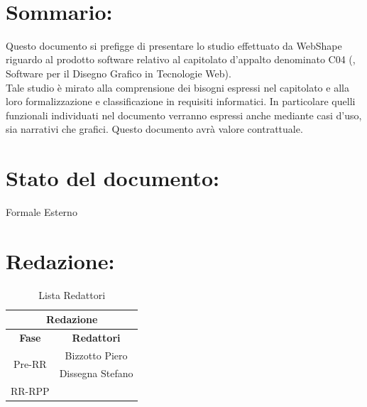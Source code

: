 \newpage


\begin{center} %
	\begin{Huge}	
				\textbf{\TITOLODOC}
			\\
	\end{Huge}
\end{center}
\parindent=18pt %
\section*{\LARGE Sommario:} %
Questo documento si prefigge di presentare lo studio effettuato da WebShape riguardo al prodotto software relativo al capitolato d'appalto denominato C04 (\blue{\ajax}, Software per il Disegno Grafico in Tecnologie Web).\\
Tale studio \`e mirato alla comprensione dei bisogni espressi nel capitolato e alla loro formalizzazione e classificazione in requisiti informatici. In particolare quelli funzionali individuati nel documento verranno espressi anche mediante casi d'uso, sia narrativi che grafici. Questo documento avr\`a valore contrattuale.

\section*{\LARGE Stato del documento:}
	Formale Esterno
\hangindent=0pt

\section*{\LARGE Redazione:}
	\begin{table}[!h]
		\begin{center}
			\begin{tabular}
				{|c|c|}
				\hline
				\multicolumn{2}{|c|}{ \textbf{Redazione} } \\
				\hline
				\textbf{Fase} & \textbf{Redattori} \\
				\hline
				\multirow{2}{*}{Pre-RR} & Bizzotto Piero\\
										& Dissegna Stefano\\
				\hline
				\multirow{2}{*}{RR-RPP} & \\
										& \\
				\hline
			\end{tabular}
			\caption{Lista Redattori} %
			\label{tabredazione}
		\end{center}
	\end{table}	
